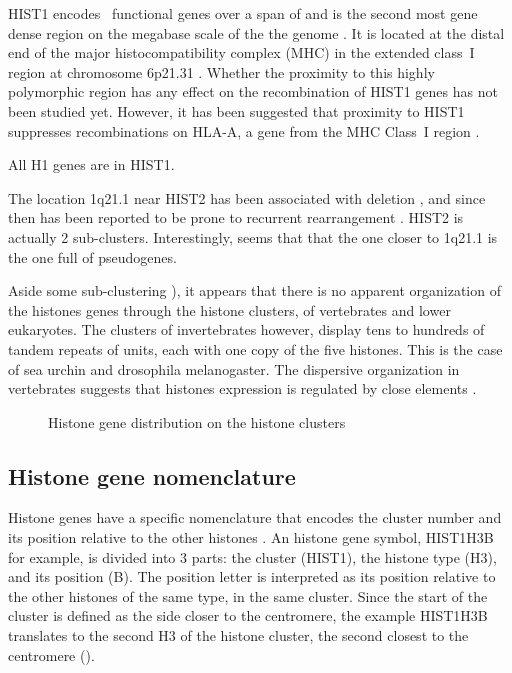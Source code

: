 \documentclass[10pt,a4paper,onecolumn,article]{memoir}
\begin{document}
      HIST1 encodes \CodingGenesInHISTOne{}~functional genes over a span of \HISTOneSpan{}
      and is the second most gene dense region on the megabase scale of the the
      genome \citep{MHC-III-analysis}. It is located at the distal end of the major
      histocompatibility complex (MHC) in the extended class~I region at chromosome 6p21.31
      \citep{MHC-I-transcript, MHC-complete-sequencing-1999}. Whether the proximity to this
      highly polymorphic region has any effect on the recombination of HIST1 genes has not
      been studied yet. However, it has been suggested that proximity to HIST1 suppresses
      recombinations on HLA-A, a gene from the MHC Class~I region \citep{MHC-repressed-by-HIST}.

      All H1 genes are in HIST1.


      The location 1q21.1 near HIST2 has been associated with deletion
      \citep{HISTTwo-prone-deletion-discovery}, and since then has been reported to be prone
      to recurrent rearrangement \citep{HISTTwo-prone-deletion-focus}. HIST2 is actually
      2 sub-clusters. Interestingly, seems that that the one closer to 1q21.1 is the one
      full of pseudogenes.

      Aside some sub-clustering ), it appears that
      there is no apparent organization
      of the histones genes through the histone clusters, of vertebrates and
      lower eukaryotes. The clusters of invertebrates however, display tens to hundreds
      of tandem repeats of units, each with one copy of the five histones. This is the
      case of sea urchin and drosophila melanogaster. The dispersive organization
      in vertebrates suggests that histones expression is regulated by close elements
      \citep{close-regulators}.

      \begin{figure}
        \centering
        \caption{Histone gene distribution on the histone clusters}
        \label{fig:cluster-organization}
      \end{figure}

    \subsection{Histone gene nomenclature}
      Histone genes have a specific nomenclature that encodes the cluster number and its
      position relative to the other histones \citep{Marzluff02}. An histone gene
      symbol, HIST1H3B for example, is divided into 3 parts: the cluster (HIST1),
      the histone type (H3), and its position (B). The position letter is interpreted as
      its position relative to the other histones of the same type, in the same cluster.
      Since the start of the cluster is defined as the side closer to the centromere, the
      example HIST1H3B translates to the second H3 of the histone cluster, the
      second closest to the centromere ().
\end{document}
